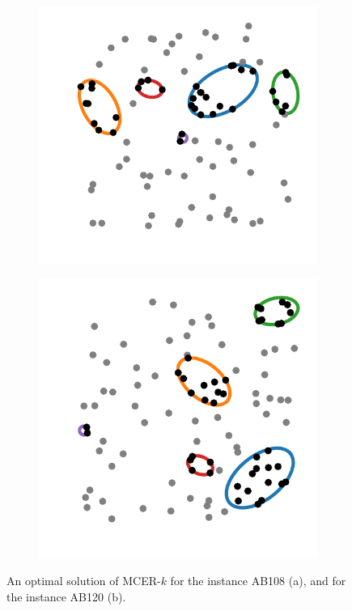 \begin{figure}[!htb]
	
\begin{subfigure}{.5\textwidth}
	\centering
	\includegraphics[scale=.9]{figures/MCER_AB108}
	\caption{}
	\label{fig:AB108}
\end{subfigure}
\begin{subfigure}{.5\textwidth}
	\centering
	\includegraphics[scale=.9]{figures/MCER_AB120}
	\caption{}
	\label{fig:AB120}
\end{subfigure}
	\caption{An optimal solution of MCER-$k$ for the instance AB108 (a), and for the instance AB120 (b).}
\end{figure}

